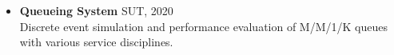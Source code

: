 \documentclass[11pt]{article}
\begin{document}
\begin{itemize}
	
	\item \textbf{Queueing System} \hfill SUT, 2020\\
	Discrete event simulation and performance evaluation of M/M/1/K queues with various service disciplines. \href{https://github.com/ImanRHT/MM1K_Queue_Simulation}{\faGithub} 
	




	
	

	
	
\end{itemize}
\end{document}
